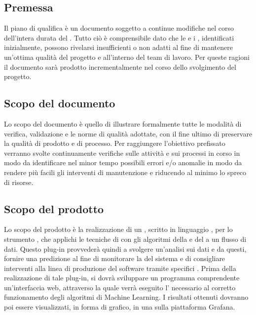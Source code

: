 \documentclass[../piano-di-qualifica.tex]{subfiles}
\begin{document}
\subsection{Premessa}%
\label{sub:premessa}
Il piano di qualifica è un documento soggetto a continue modifiche nel corso dell'intera durata del .
Tutto ciò è comprensibile dato che le  e i , identificati inizialmente, possono rivelarsi insufficienti o non adatti al fine di mantenere un'ottima qualità del progetto e all'interno del team di lavoro.
Per queste ragioni il documento sarà prodotto incrementalmente nel corso dello svolgimento del progetto.

\subsection{Scopo del documento}%
\label{sub:scopo_del_documento}
Lo scopo del documento è quello di illustrare formalmente tutte le modalità di verifica, validazione e le norme di qualità adottate, con il fine ultimo di preservare la qualità di prodotto e di processo.
Per raggiungere l'obiettivo prefissato verranno svolte continuamente verifiche sulle attività e sui processi in corso in modo da identificare nel minor tempo possibili errori e/o anomalie in modo da rendere più facili gli interventi di manutenzione e riducendo al minimo lo spreco di risorse.

\subsection{Scopo del prodotto}%
\label{sub:scopo_del_prodotto}
Lo scopo del prodotto è la realizzazione di un , scritto in linguaggio , per lo strumento  ,
che applichi le tecniche di  con gli algoritmi della  e del  a un flusso di dati.
Questo plug-in provvederà quindi a svolgere un'analisi sui dati e da questi, fornire una predizione al fine di monitorare la  del sistema e di consigliare 
interventi alla linea di produzione del software tramite specifici .
Prima della realizzazione di tale plug-in, si dovrà sviluppare un programma comprendente un'interfaccia web, attraverso la quale verrà eseguito l' necessario al corretto
funzionamento degli algoritmi di Machine Learning.
I risultati ottenuti dovranno poi essere visualizzati, in forma di grafico, in una  sulla piattaforma Grafana.
\end{document}
